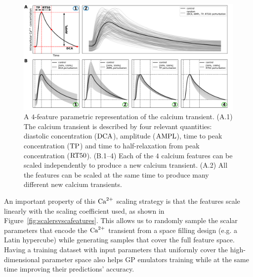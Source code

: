\begin{figure}[ht!]
    \myfloatalign
    \includegraphics[width=\textwidth]{figures/chapter06/ca_biomarkers_and_scaling_explained_with_labels.pdf}
    \caption{A $4$-feature parametric representation of the calcium transient. (A.1) The calcium transient is described by four relevant quantities: diastolic concentration ($\textrm{DCA}$), amplitude ($\textrm{AMPL}$), time to peak concentration ($\textrm{TP}$) and time to half-relaxation from peak concentration ($\textrm{RT50}$). (B.1--4) Each of the $4$ calcium features can be scaled independently to produce a new calcium transient. (A.2) All the features can be scaled at the same time to produce many different new calcium transients.}
    \label{fig:algintopractice}
\end{figure}

\vspace{0.2cm}
An important property of this $\textrm{Ca}^{2+}$ scaling strategy is that the features scale linearly with the scaling coefficient used, as shown in Figure~\ref{fig:scalersvscafeatures}. This allows us to randomly sample the scalar parameters that encode the $\textrm{Ca}^{2+}$ transient from a space filling design (e.g. a Latin hypercube) while generating samples that cover the full feature space. Having a training dataset with input parameters that uniformly cover the high-dimensional parameter space also helps GP emulators training while at the same time improving their predictions' accuracy.

